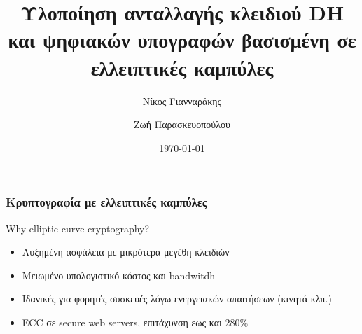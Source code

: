 \documentclass{beamer}
\title[Elliptic Curve Cryptography]{Υλοποίηση ανταλλαγής κλειδιού DH και ψηφιακών υπογραφών βασισμένη σε ελλειπτικές καμπύλες}
\author{Νίκος Γιανναράκης \\ \and Ζωή Παρασκευοπούλου}
\institute[]
{
Σχολή Ηλεκτρολόγων Μηχανικών και Μηχανικών Υπολογιστών\\
Εθνικό Μετσόβιο Πολυτεχνείο
}
\date{\today}
\begin{document}
\begin{frame}
\titlepage
\end{frame}
\begin{frame}
\frametitle{Κρυπτογραφία με ελλειπτικές καμπύλες}
\begin{block}
{Why elliptic curve cryptography?}
\begin{itemize}
\item Αυξημένη ασφάλεια με μικρότερα μεγέθη κλειδιών
\item Μειωμένο υπολογιστικό κόστος και bandwitdh
\item Ιδανικές για φορητές συσκευές λόγω ενεργειακών απαιτήσεων (κινητά κλπ.)
\item ECC σε secure web servers, επιτάχυνση εως και $280\%$ \cite{SUN}
\end{itemize}
\end{block}
\end{frame}
\end{document}
